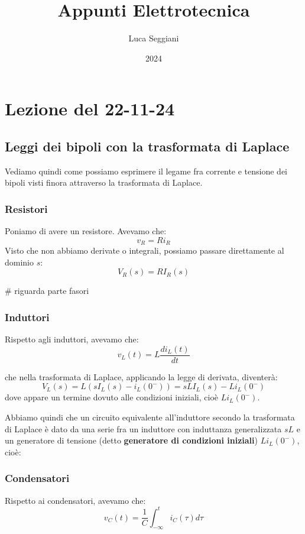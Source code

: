 \documentclass[a4paper,11pt]{article}
\title{Appunti Elettrotecnica}
\author{Luca Seggiani}
\date{2024}
\begin{document}
\section{Lezione del 22-11-24}

\thispagestyle{empty}
\pagestyle{fancy}

\subsection{Leggi dei bipoli con la trasformata di Laplace}
Vediamo quindi come possiamo esprimere il legame fra corrente e tensione dei bipoli visti finora attraverso la trasformata di Laplace.
\subsubsection{Resistori}
Poniamo di avere un resistore. Avevamo che:
$$
v_R = R i_R
$$
Visto che non abbiamo derivate o integrali, possiamo passare direttamente al dominio $s$:
$$
V_R(s) = R I_R(s)
$$

# riguarda parte fasori

\subsubsection{Induttori}
Rispetto agli induttori, avevamo che:
$$
v_L(t) = L\frac{di_L(t)}{dt}
$$

che nella trasformata di Laplace, applicando la legge di derivata, diventerà:
$$
V_L(s) = L \left( s I_L(s) - i_L(0^-) \right) = s L I_L(s) - L i_L (0^-)
$$
dove appare un termine dovuto alle condizioni iniziali, cioè $L i_L (0^-)$. 

Abbiamo quindi che un circuito equivalente all'induttore secondo la trasformata di Laplace è dato da una serie fra un induttore con induttanza generalizzata $sL$ e un generatore di tensione (detto \textbf{generatore di condizioni iniziali}) $L i_L(0^-)$, cioè:

\begin{center}
\end{center}

\subsubsection{Condensatori}
Rispetto ai condensatori, avevamo che:
$$
v_C(t) = \frac{1}{C} \int_{-\infty}^t i_C(\tau) d\tau
$$
\end{document}
